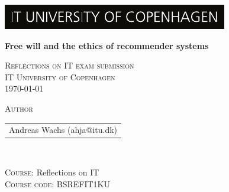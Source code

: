 \begin{titlepage}
  
  \includegraphics[width=\textwidth]{images/ITU_LOGO.pdf}
  
  \begin{center}
 
    {\Huge\textbf{Free will and the ethics of recommender systems} \par}
    \vspace{1cm}
    
   \textsc{
        Reflections on IT exam submission \\
        IT University of Copenhagen \\
        \today
    }

    \vspace{2cm}

    \textsc{
        \large
        Author
    }\\
    \begin{tabular}{c}
            Andreas Wachs (ahja@itu.dk) \\
    \end{tabular}\\
    \vspace{2cm}

    \textsc{\large
        Course: 
    } Reflections on IT\\
    \textsc{\large
        Course code: 
    }
    BSREFIT1KU
    \vspace{2cm}\\

  \end{center}
  
  \vspace*{\fill}

\end{titlepage}